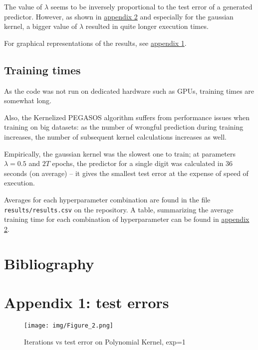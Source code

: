 \documentclass[a4paper]{article}
\begin{document}
The value of \(\lambda\) seems to be inversely proportional to the test error of a generated predictor. However, as shown in \hyperref[org5ad8668]{appendix 2} and especially for the gaussian kernel, a bigger value of \(\lambda\) resulted in quite longer execution times.

For graphical representations of the results, see \hyperref[org7b7feca]{appendix 1}.

\subsection{Training times}
\label{sec:orge1afe61}

As the code was not run on dedicated hardware such as GPUs, training times are somewhat long.

Also, the Kernelized PEGASOS algorithm suffers from performance issues when training on big datasets: as the number of wrongful prediction during training increases, the number of subsequent kernel calculations increases as well.

Empirically, the gaussian kernel was the slowest one to train; at parameters \(\lambda=0.5\) and \(2T\) epochs, the predictor for a single digit was calculated in 36 seconds (on average) -- it gives the smallest test error at the expense of speed of execution.  

Averages for each hyperparameter combination are found in the file \texttt{results/results.csv} on the repository. A table, summarizing the average training time for each combination of hyperparameter can be found in \hyperref[org5ad8668]{appendix 2}.

\section{Bibliography}
\label{sec:org3493c42}

 



\newpage

\section{Appendix 1: test errors}
\label{sec:org470930a}
\label{org7b7feca}

\begin{figure}[htbp]
\centering
\texttt{[image: img/Figure\_2.png]}
\caption[Short caption]{Iterations vs test error on Polynomial Kernel, exp=1}
\end{figure}
\end{document}

